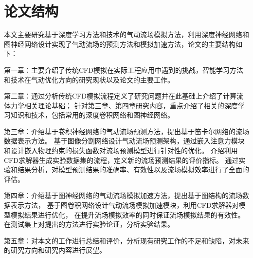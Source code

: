 \section{论文结构}
本文主要研究基于深度学习方法和技术的气动流场模拟方法，利用深度神经网络和图神经网络设计实现了气动流场的预测方法和模拟加速方法，论文的主要结构如下：

第一章：主要介绍了传统CFD模拟在实际工程应用中遇到的挑战，智能学习方法和技术在气动优化方向的研究现状以及论文的主要工作。

第二章：通过分析传统CFD模拟流程定义了研究问题并在此基础上介绍了计算流体力学相关理论基础；
针对第三章、第四章研究内容，重点介绍了相关的深度学习知识和技术，包括常用的深度卷积网络和图神经网络。

第三章：介绍基于卷积神经网络的气动流场预测方法，提出基于笛卡尔网络的流场数据表示方法。
基于图像分割网络设计气动流场预测架构，通过嵌入注意力模块和设计嵌入物理约束的损失函数对流场预测模型进行针对性的优化。
介绍利用CFD求解器生成实验数据集的流程，定义新的流场预测结果的评价指标。
通过实验和结果分析，对模型预测结果的准确率、有效性以及流场模拟效率进行了全面的评估。

第四章：介绍基于图神经网络的气动流场模拟加速方法，提出基于图结构的流场数据表示方法，
基于图卷积网络设计气动流场模拟加速模块，利用CFD求解器对模型模拟结果进行优化，
在提升流场模拟效率的同时保证流场模拟结果的有效性。
在测试集上对提出的方法进行实验论证，分析实验结果。

第五章：对本文的工作进行总结和评价，分析现有研究工作的不足和缺陷，对未来的研究方向和研究内容进行展望。











